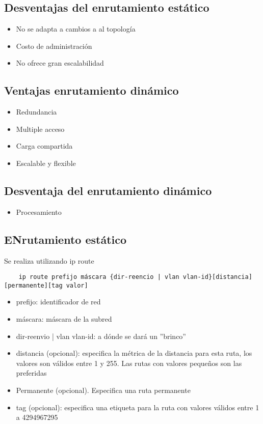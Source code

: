 \subsection{Desventajas del enrutamiento estático}
\begin{itemize}
    \item {No se adapta a cambios a al topología}
    \item {Costo de administración}
    \item {No ofrece gran escalabilidad}
\end{itemize}

\subsection{Ventajas enrutamiento dinámico}
\begin{itemize}
    \item Redundancia
    \item Multiple acceso
    \item Carga compartida 
    \item Escalable y flexible
\end{itemize}

\subsection{Desventaja del enrutamiento dinámico }
\begin{itemize}
    \item Procesamiento
\end{itemize}

\subsection{ENrutamiento estático}
Se realiza utilizando ip route 
\begin{lstlisting}
    ip route prefijo máscara {dir-reencio | vlan vlan-id}[distancia][permanente][tag valor]
\end{lstlisting}

\begin{itemize}
    \item prefijo: identificador de red 
    \item máscara: máscara de la subred 
    \item dir-reenvio | vlan vlan-id: a dónde se dará un ''brinco''
    \item distancia (opcional): especifica la métrica de la distancia para esta ruta, los valores son válidos entre 1 y 255. Las rutas con valores pequeños son las preferidas
    \item Permanente (opcional). Especifica una ruta permanente
    \item tag (opcional): especifica una etiqueta para la ruta con valores válidos entre 1 a 4294967295
\end{itemize}

